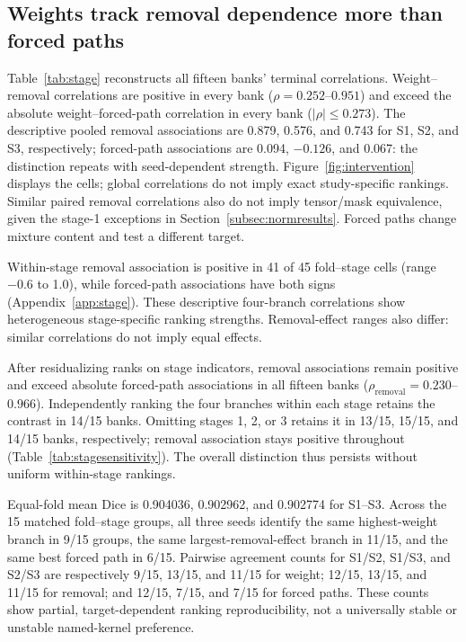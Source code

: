 \documentclass[mathematics,article,submit,pdftex,moreauthors]{Definitions/mdpi}
\begin{document}
\subsection{Weights track removal dependence more than forced paths}
Table~\ref{tab:stage} reconstructs all fifteen banks' terminal correlations. Weight--removal
correlations are positive in every bank ($\rho=0.252$--$0.951$) and exceed
the absolute weight--forced-path correlation in every bank
($|\rho|\leq0.273$). The descriptive pooled removal associations are
0.879, 0.576, and 0.743 for S1, S2, and S3, respectively; forced-path associations are
0.094, $-0.126$, and 0.067: the distinction repeats with seed-dependent
strength. Figure~\ref{fig:intervention} displays the cells; global correlations
do not imply exact study-specific rankings. Similar paired removal correlations
also do not imply tensor/mask equivalence, given the stage-1 exceptions in
Section~\ref{subsec:normresults}. Forced paths change mixture content and
test a different target.

Within-stage removal association is positive in 41 of 45 fold--stage cells
(range $-0.6$ to 1.0), while forced-path associations have both signs
(Appendix~\ref{app:stage}). These descriptive four-branch correlations show
heterogeneous stage-specific ranking strengths. Removal-effect ranges also
differ: similar correlations do not imply equal effects.

After residualizing ranks on stage indicators, removal associations remain
positive and exceed absolute forced-path associations in all fifteen banks
($\rho_{\mathrm{removal}}=0.230$--$0.966$). Independently ranking the four
branches within each stage retains the contrast in 14/15 banks. Omitting
stages 1, 2, or 3 retains it in 13/15, 15/15, and 14/15 banks, respectively;
removal association stays positive throughout (Table~\ref{tab:stagesensitivity}).
The overall distinction thus persists without uniform within-stage rankings.

Equal-fold mean Dice is 0.904036, 0.902962, and 0.902774 for S1--S3.
Across the 15 matched fold--stage groups, all three seeds identify the same
highest-weight branch in 9/15 groups, the same largest-removal-effect branch
in 11/15, and the same best forced path in 6/15. Pairwise agreement counts
for S1/S2, S1/S3, and S2/S3 are respectively 9/15, 13/15, and 11/15 for
weight; 12/15, 13/15, and 11/15 for removal; and 12/15, 7/15, and 7/15 for
forced paths. These counts show partial, target-dependent ranking
reproducibility, not a universally stable or unstable named-kernel preference.
\end{document}

